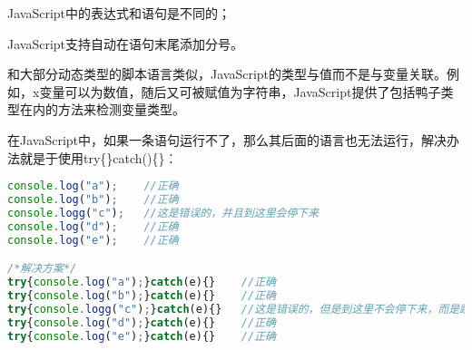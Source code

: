 \begin{compactitem}
\item JavaScript中的表达式和语句是不同的；
\item JavaScript支持自动在语句末尾添加分号。
\end{compactitem}

和大部分动态类型的脚本语言类似，JavaScript的类型与值而不是与变量关联。例如，x变量可以为数值，随后又可被赋值为字符串，JavaScript提供了包括鸭子类型在内的方法来检测变量类型。

在JavaScript中，如果一条语句运行不了，那么其后面的语言也无法运行，解决办法就是于使用try\{\}catch()\{\}︰

\begin{lstlisting}[language=JavaScript]
console.log("a");    //正确
console.log("b");    //正确
console.logg("c");   //这是错误的，并且到这里会停下来
console.log("d");    //正确
console.log("e");    //正确

/*解决方案*/
try{console.log("a");}catch(e){}    //正确
try{console.log("b");}catch(e){}    //正确
try{console.logg("c");}catch(e){}   //这是错误的，但是到这里不会停下来，而是跳过
try{console.log("d");}catch(e){}    //正确
try{console.log("e");}catch(e){}    //正确
\end{lstlisting}



